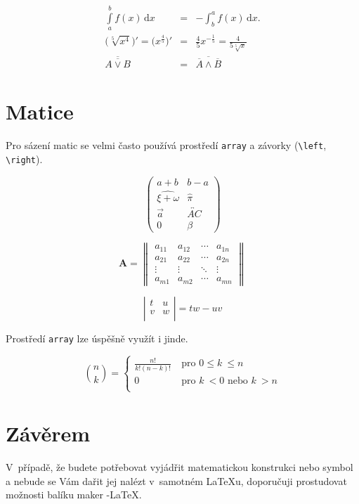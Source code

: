 \documentclass[11pt, a4paper]{article}
\theoremstyle{definition}
\theoremstyle{plain}
\begin{document}
\begin{twocolumn}
\setcounter{equation}{1}

\begin{eqnarray}
\int\limits_a^b \! f(x) \, \mathrm{d}x &= &-\int_b^a \! f(x) \, \mathrm{d}x. \\
\Big( \sqrt[5]{x^4} \Big)' = \Big( x^{\frac{4}{5}} \Big)' &= &\frac{4}{5} x^{-\frac{1}{5}} = \frac{4}{5\sqrt[5]{x}} \\
\overline{\overline{A \vee B}} &= &\overline{\overline{A}\wedge \overline{B}}
\end{eqnarray}


\section{Matice}

Pro sázení matic se velmi často používá prostředí \texttt{array} a závorky (\verb|\left|, \verb|\right|).

$$
\left( \begin{array}{cc}
a+b & b-a \\
\widehat{\xi + \omega} & \hat{\pi} \\
\vec{a} & \overleftrightarrow{AC} \\
0 & \beta
\end{array} \right)
$$

$$ \mathbf{A}=
\left\|
\begin{array}{cccc}
  a_{11} & a_{12} & \cdots & a_{1n} \\
  a_{21} & a_{22} & \cdots & a_{2n} \\
  \vdots  & \vdots  & \ddots & \vdots \\
  a_{m1} & a_{m2} & \cdots & a_{mn} 
\end{array}
\right\|
$$

$$
\left | \begin{array}{rl}
  t& u\\
  v& w\\
\end{array} \right |
= tw - uv
$$

Prostředí \texttt{array} lze úspěšně využít i jinde.

$$
\binom{n}{k} = \left\{ 
\begin{array}{ll}
\frac{n!}{k!(n-k)!} & \ \mbox{pro $0 \leq k~\leq n$} \\
0 & \ \mbox{pro $k\  < 0$ nebo $k\  > n$} \\
\end{array} \right.
$$

\section{Závěrem}

V~případě, že budete potřebovat vyjádřit matematickou konstrukci nebo symbol a nebude se Vám dařit jej nalézt v~samotném \LaTeX u, doporučuji prostudovat možnosti balíku maker \AmS-\LaTeX.

\end{twocolumn}
\end{document}
